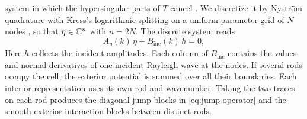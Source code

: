 system in which the hypersingular parts of $T$ cancel
\cite{DominguezLyonTurc2016}. We discretize it by Nyström quadrature with
Kress's logarithmic splitting on a uniform parameter grid of $N$ nodes
\cite{Kress1991,HaoBarnettMartinssonYoung2014}, so that $\eta\in\mathbb{C}^n$ with
$n=2N$. The discrete system reads
\begin{equation}\label{eq:cell-system}
  A_\eta(k)\,\eta+B_{\mathrm{inc}}(k)\,h=0,
\end{equation}
Here $h$ collects the incident amplitudes. Each column of $B_{\mathrm{inc}}$
contains the values and normal derivatives of one incident Rayleigh wave
at the nodes. If several rods occupy the cell, the exterior potential is
summed over all their boundaries. Each interior representation uses its
own rod and wavenumber. Taking the two traces on each rod produces the
diagonal jump blocks in \eqref{eq:jump-operator} and the smooth exterior
interaction blocks between distinct rods.

